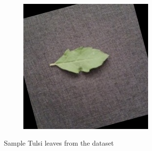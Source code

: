 \documentclass[twocolumn]{article}
\begin{document}
\begin{figure}[H]
\begin{subfigure}[b]{0.30\columnwidth}
    \end{subfigure}
    \hfill
    \begin{subfigure}[b]{0.30\columnwidth}
        \includegraphics[width=\textwidth]{tulsi9}
    \end{subfigure}
    \caption{Sample Tulsi leaves from the dataset}
    \label{fig:tulsi-samples}
\end{figure}
\end{document}
